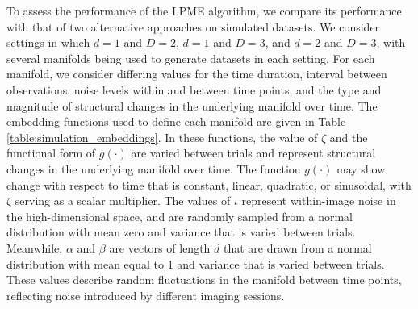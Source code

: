 \documentclass[11pt,reqno]{article}
\theoremstyle{definition}
\begin{document}
To assess the performance of the LPME algorithm, we compare its performance with that of two alternative approaches on simulated datasets. We consider settings in which $d = 1$ and $D = 2$, $d = 1$ and $D = 3$, and $d = 2$ and $D = 3$, with several manifolds being used to generate datasets in each setting. For each manifold, we consider differing values for the time duration, interval between observations, noise levels within and between time points, and the type and magnitude of structural changes in the underlying manifold over time. The embedding functions used to define each manifold are given in Table \ref{table:simulation_embeddings}. In these functions, the value of $\zeta$ and the functional form of $g(\cdot)$ are varied between trials and represent structural changes in the underlying manifold over time. The function $g(\cdot)$ may show change with respect to time that is constant, linear, quadratic, or sinusoidal, with $\zeta$ serving as a scalar multiplier. The values of $\iota$ represent within-image noise in the high-dimensional space, and are randomly sampled from a normal distribution with mean zero and variance that is varied between trials. Meanwhile, $\alpha$ and $\beta$ are vectors of length $d$ that are drawn from a normal distribution with mean equal to 1 and variance that is varied between trials. These values describe random fluctuations in the manifold between time points, reflecting noise introduced by different imaging sessions.
\end{document}
